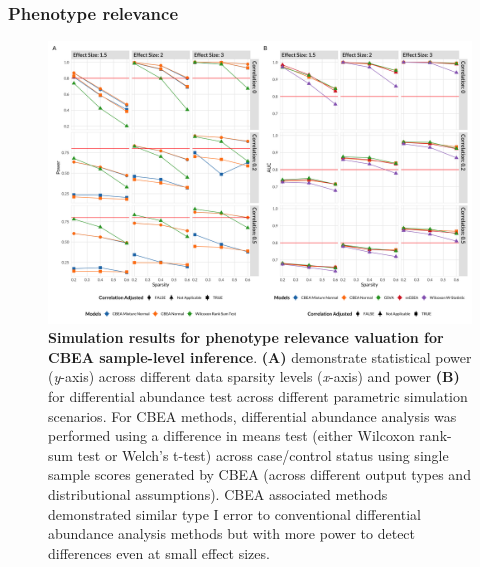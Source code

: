 \documentclass{article}
\begin{document}


\subsubsection{Phenotype relevance} 

\begin{figure}[!h]
    \centering
    \includegraphics[width = \textwidth]{figures/sim_ss_pwr.png}
    \caption{\textbf{Simulation results for phenotype relevance valuation for CBEA sample-level inference}. \textbf{(A)} demonstrate statistical power (\emph{y}-axis) across different data sparsity levels (\emph{x}-axis) and power \textbf{(B)} for differential abundance test across different parametric simulation scenarios. For CBEA methods, differential abundance analysis was performed using a difference in means test (either Wilcoxon rank-sum test or Welch's t-test) across case/control status using single sample scores generated by CBEA (across different output types and distributional assumptions). CBEA associated methods demonstrated similar type I error to conventional differential abundance analysis methods but with more power to detect differences even at small effect sizes.} 
    \label{fig:s3}
\end{figure}
\end{document}
